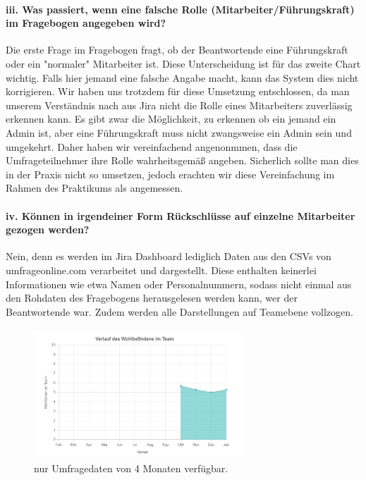 \documentclass[a4paper,12pt,]{article}
\begin{document}
\paragraph{iii. Was passiert, wenn eine falsche Rolle (Mitarbeiter/Führungskraft) im Fragebogen angegeben wird?}
Die erste Frage im Fragebogen fragt, ob der Beantwortende eine Führungskraft oder ein "normaler"  Mitarbeiter ist.
Diese Unterscheidung ist für das zweite Chart wichtig. Falls hier jemand eine falsche Angabe macht, kann das System dies nicht korrigieren. Wir haben uns trotzdem für diese Umsetzung entschlossen, da man unserem Verständnis nach aus Jira nicht die Rolle eines Mitarbeiters zuverlässig erkennen kann. Es gibt zwar die Möglichkeit, zu erkennen ob ein jemand ein Admin ist, aber eine Führungskraft muss nicht zwangsweise ein Admin sein und umgekehrt. Daher haben wir vereinfachend angenonmmen, dass die Umfrageteilnehmer ihre Rolle wahrheitsgemäß angeben. Sicherlich sollte man dies in der Praxis nicht so umsetzen, jedoch erachten wir diese Vereinfachung im Rahmen des Praktikums als angemessen.

\paragraph{iv. Können in irgendeiner Form Rückschlüsse auf einzelne Mitarbeiter gezogen werden?}
Nein, denn es werden im Jira Dashboard lediglich Daten aus den CSVs von umfrageonline.com verarbeitet und dargestellt. Diese enthalten keinerlei Informationen wie etwa Namen oder Personalnummern, sodass nicht einmal aus den Rohdaten des Fragebogens herausgelesen werden kann, wer der Beantwortende war. Zudem werden alle Darstellungen auf Teamebene vollzogen.
\begin{figure}[htb]
\centering
\includegraphics[width=0.7\textwidth]{picture2.png}
\caption{nur Umfragedaten von 4 Monaten verfügbar.}
\end{figure}
\end{document}
